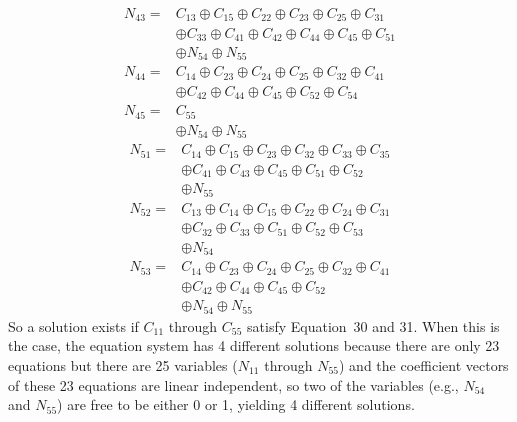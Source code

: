 \documentclass[12pt,letterpaper]{article}
\begin{document}
\begin{align}
N_{43} = & C_{13} \oplus C_{15} \oplus C_{22} \oplus C_{23} \oplus C_{25} \oplus C_{31} \\\nonumber
& \oplus C_{33} \oplus C_{41} \oplus C_{42} \oplus C_{44} \oplus C_{45} \oplus C_{51} \\\nonumber
& \oplus N_{54} \oplus N_{55}\\
N_{44} = & C_{14} \oplus C_{23} \oplus C_{24} \oplus C_{25} \oplus C_{32} \oplus C_{41} \\\nonumber
& \oplus C_{42} \oplus C_{44} \oplus C_{45} \oplus C_{52} \oplus C_{54}\\
N_{45} = & C_{55} \\\nonumber
& \oplus N_{54} \oplus N_{55}
\end{align}
\begin{align}
N_{51} = & C_{14} \oplus C_{15} \oplus C_{23} \oplus C_{32} \oplus C_{33} \oplus C_{35} \\\nonumber
& \oplus C_{41} \oplus C_{43} \oplus C_{45} \oplus C_{51} \oplus C_{52} \\\nonumber
& \oplus N_{55}\\
N_{52} = & C_{13} \oplus C_{14} \oplus C_{15} \oplus C_{22} \oplus C_{24} \oplus C_{31} \\\nonumber
& \oplus C_{32} \oplus C_{33} \oplus C_{51} \oplus C_{52} \oplus C_{53}\\\nonumber
& \oplus N_{54}\\
N_{53} = & C_{14} \oplus C_{23} \oplus C_{24} \oplus C_{25} \oplus C_{32} \oplus C_{41} \\\nonumber
& \oplus C_{42} \oplus C_{44} \oplus C_{45} \oplus C_{52}\\\nonumber
& \oplus N_{54} \oplus N_{55}
\end{align}
So a solution exists if $C_{11}$ through $C_{55}$ satisfy Equation~30 and 31. When this is the case, the equation system has 4 different solutions because there are only 23 equations but there are 25 variables ($N_{11}$ through $N_{55}$) and the coefficient vectors of these 23 equations are linear independent, so two of the variables (e.g., $N_{54}$ and $N_{55}$) are free to be either 0 or 1, yielding 4 different solutions.
\end{document}
